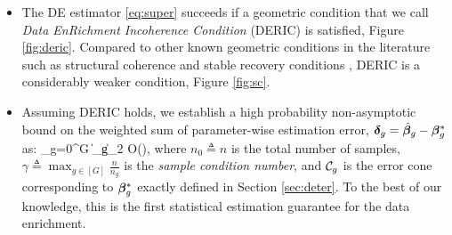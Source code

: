 \begin{itemize}[leftmargin = .4cm]
	\item The DE estimator \eqref{eq:super} succeeds if a geometric condition that we call \emph{Data EnRichment Incoherence Condition} (DERIC) is satisfied, Figure \ref{fig:deric}. Compared to other known geometric conditions in the literature such as structural coherence \cite{guba16} and stable recovery conditions \cite{mctr13}, DERIC is a considerably weaker condition, Figure \ref{fig:sc}.
	\item Assuming DERIC holds, we establish a high probability non-asymptotic bound on the weighted sum of parameter-wise estimation error, $\boldsymbol{\delta}_g = \hat{\boldsymbol{\beta}}_g - \boldsymbol{\beta}_g^*$ as:
	\be
	\label{eq:errorsum}
	\sum_{g=0}^{G}   \|\ddelta_g\|_2 \leq  \gamma O\left(\right),
	\ee
	where $n_0 \triangleq n$ is the total number of samples, $\gamma \triangleq \max_{g \in [G] } \frac{n}{n_g}$ is the \emph{sample condition number}, and $\cC_g$ is the error cone corresponding to $\boldsymbol{\beta}_g^*$ exactly defined in Section \ref{sec:deter}.
	To the best of our knowledge, this is the first statistical estimation guarantee for the data enrichment.%
	

\end{itemize}
